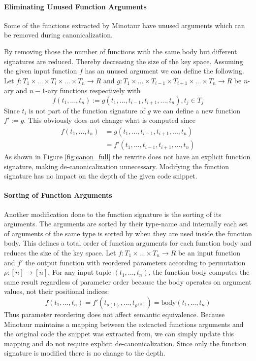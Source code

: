 	

	\paragraph{Eliminating Unused Function Arguments}
	Some of the functions extracted by Minotaur have unused arguments which can be removed during canonicalization.

	By removing those the number of functions with the same body but different signatures are reduced.
	Thereby decreasing the size of the key space.
	Assuming the given input function $f$ has an unused argument we can define the following.
	Let $f: T_1 \times ... \times T_i \times ... \times T_n \to R$ and $g: T_1 \times ... \times T_{i-1} \times T_{i+1} \times ... \times T_n \to R$ be $n$-ary and $n-1$-ary functions respectively with
	\[
		f(t_1, ..., t_n) := g(t_1, ..., t_{i-1}, t_{i+1}, ..., t_n), t_j \in T_j
	\]
	Since $t_i$ is not part of the function signature of $g$ we can define a new function $f' := g$.
	This obviously does not change what is computed since
	\begin{align*}
		f(t_1, ..., t_n) &= g(t_1, ..., t_{i-1}, t_{i+1}, ..., t_n) \\
						 &= f'(t_1, ..., t_{i-1}, t_{i+1}, ..., t_n)
	\end{align*}	
	As shown in Figure \ref{fig:canon_full} the rewrite does not have an explicit function signature, making de-canonicalization unnecessary.
	Modifying the function signature has no impact on the depth of the given code snippet.

	\paragraph{Sorting of Function Arguments}
	Another modification done to the function signature is the sorting of its arguments.
	The arguments are sorted by their type-name and internally each set of arguments of the same type is sorted by when they are used inside the function body.
	This defines a total order of function arguments for each function body and reduces the size of the key space.
	Let $f: T_1 \times ... \times T_n \to R$ be an input function and $f'$ the output function with reordered parameters according to permutation $\rho: [n] \to [n]$.
    For any input tuple $(t_1, ..., t_n)$, the function body computes the same result regardless of parameter order because the body operates on argument values, not their positional indices:
    \[
        f(t_1, ..., t_n) = f'(t_{\rho(1)}, ..., t_{\rho^(n)}) = \text{body}(t_1, ..., t_n)
    \]
    Thus parameter reordering does not affect semantic equivalence.
	Because Minotaur maintains a mapping between the extracted functions arguments and the original code the snippet was extracted from, we can simply update this mapping and do not require explicit de-canonicalization.
	Since only the function signature is modified there is no change to the depth.

